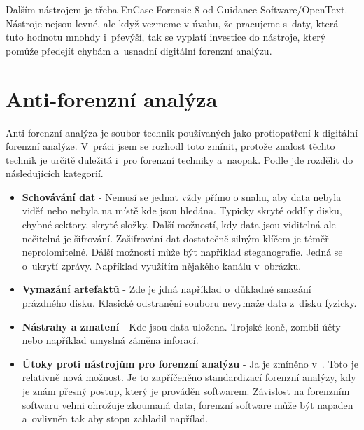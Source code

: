 \documentclass[thesis=B,czech]{FITthesis}[2012/06/26]
\begin{document}
Dalším nástrojem je třeba EnCase Forensic 8 od Guidance Software/OpenText. Nástroje nejsou levné, ale když vezmeme v úvahu, že pracujeme s~daty, která tuto hodnotu mnohdy i~převýší, tak se vyplatí investice do nástroje, který pomůže předejít chybám a~usnadní digitální forenzní analýzu.

\chapter{Anti-forenzní analýza}

Anti-forenzní analýza je soubor technik používaných jako protiopatření k digitální forenzní analýze. V~práci jsem se rozhodl toto zmínit, protože znalost těchto technik je určitě duležitá i~pro forenzní techniky a~naopak. Podle \cite{anti-prezi} jde rozdělit do následujících kategorií.

\begin{itemize}

\item \textbf{Schovávání dat} - Nemusí se jednat vždy přímo o snahu, aby data nebyla viděť nebo nebyla na místě kde jsou hledána. Typicky skryté oddíly disku, chybné sektory, skryté složky. Další možností, kdy data jsou viditelná ale nečitelná je šifrování. Zašifrování dat dostatečně silným klíčem je téměř neprolomitelné. Dálší možností může být napřiklad steganografie. Jedná se o~ukrytí zprávy. Například využítím nějakého kanálu v~obrázku.
\item \textbf{Vymazání artefaktů} - Zde je jdná například o~důkladné smazání prázdného disku. Klasické odstranění souboru nevymaže data z~disku fyzicky. 
\item \textbf{Nástrahy a zmatení} - Kde jsou data uložena. Trojské koně, zombii účty nebo například umyslná záměna inforací. 
\item \textbf{Útoky proti nástrojům pro forenzní analýzu} - Ja je zmíněno v~\cite{anti-prezi}. Toto je relativně nová možnost. Je to zapříčeněno standardizací forenzní analýzy, kdy je znám přesný postup, který je prováděn softwarem. Závislost na forenzním softwaru velmi ohrožuje zkoumaná data, forenzní software může být napaden a~ovlivněn tak aby stopu zahladil napřílad. 

\end{itemize}
\end{document}
